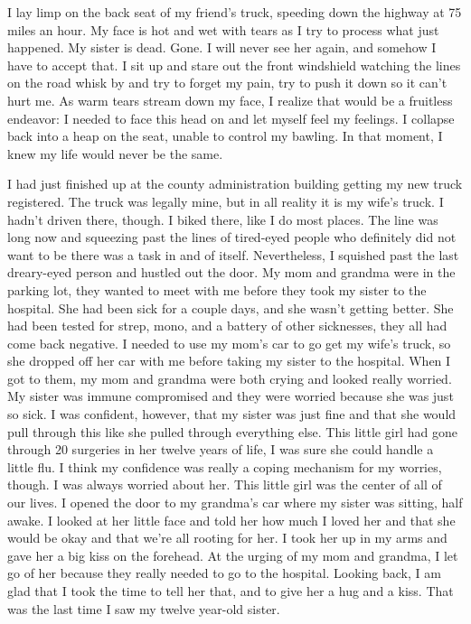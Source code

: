 I lay limp on the back seat of my friend's truck,
speeding down the highway at 75 miles an hour.
My face is hot and wet with tears as I try to process what just happened.
My sister is dead.
Gone.
I will never see her again, and somehow I have to accept that.
I sit up and stare out the front windshield watching the lines on the road whisk by
and try to forget my pain, try to push it down so it can't hurt me.
As warm tears stream down my face, I realize that would be a fruitless
endeavor:
I needed to face this head on and let myself feel my feelings.
I collapse back into a heap on the seat, unable to control my bawling.
In that moment, I knew my life would never be the same.
 
I had just finished up at the county administration building getting my new truck registered.
The truck was legally mine, but in all reality it is my wife's truck.
I hadn't driven there, though. 
I biked there, like I do most places.
The line was long now and squeezing past the lines of tired-eyed people
who definitely did not want to be there was a task in and of itself.
Nevertheless, I squished past the last dreary-eyed person and hustled out the door.
My mom and grandma were in the parking lot, they wanted to meet with me before they took my sister
to the hospital.
She had been sick for a couple days, and she wasn't getting better.
She had been tested for strep, mono, and a battery of other sicknesses, 
they all had come back negative.
I needed to use my mom's car to go get my wife's truck, so she
dropped off her car with me before taking my sister to the hospital.
When I got to them, my mom and grandma were both crying and looked really worried.
My sister was immune compromised and they were worried because she was just so sick.
I was confident, however, that my sister was just fine and that she would pull
through this like she pulled through everything else.
This little girl had gone through 20 surgeries in her twelve years of life, 
I was sure she could handle a little flu.
I think my confidence was really a coping mechanism for my worries, though.
I was always worried about her. 
This little girl was the center of all of our lives. 
I opened the door to my grandma's car where my sister was sitting, half awake.
I looked at her little face and told her how much I loved her and that she would be okay
and that we're all rooting for her.
I took her up in my arms and gave her a big kiss on the forehead.
At the urging of my mom and grandma, I let go of her because they really needed to go to the hospital.
Looking back, I am glad that I took the time to tell her that, and to give her a hug and a kiss.
That was the last time I saw my twelve year-old sister.

